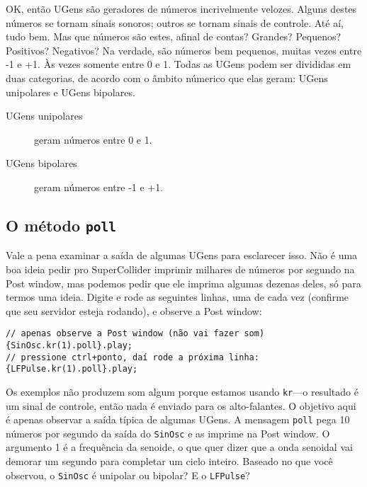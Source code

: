 OK, então UGens são geradores de números incrivelmente velozes. Alguns destes números se tornam sinais sonoros; outros se tornam sinais de controle. Até aí, tudo bem. Mas que números são estes, afinal de contas? Grandes? Pequenos? Positivos? Negativos? Na verdade, são números bem pequenos, muitas vezes entre -1 e +1. Às vezes somente entre 0 e 1. Todas as UGens podem ser divididas em duas categorias, de acordo com o âmbito númerico que elas geram: UGens unipolares e UGens bipolares.

\begin{description}
\item[UGens unipolares] geram números entre 0 e 1.
\item[UGens bipolares] geram números entre -1 e +1.

\end{description}

\subsection{O método \texttt{poll}}

Vale a pena examinar a saída de algumas UGens para esclarecer isso. Não é uma boa ideia pedir pro SuperCollider imprimir milhares de números por segundo na Post window, mas podemos pedir que ele imprima algumas dezenas deles, só para termos uma ideia. Digite e rode as seguintes linhas, uma de cada vez (confirme que seu servidor esteja rodando), e observe a Post window: 

\begin{lstlisting}[style=SuperCollider-IDE, basicstyle=\scttfamily\footnotesize]
// apenas observe a Post window (não vai fazer som)
{SinOsc.kr(1).poll}.play;
// pressione ctrl+ponto, daí rode a próxima linha:
{LFPulse.kr(1).poll}.play;
\end{lstlisting}

Os exemplos não produzem som algum porque estamos usando \texttt{kr}---o resultado é um sinal de controle, então nada é enviado para os alto-falantes. O objetivo aqui é apenas observar a saída típica de algumas UGens. A mensagem \texttt{poll} pega 10 números por segundo da saída do \texttt{SinOsc} e as imprime na Post window. O argumento 1 é a frequência da senoide, o que quer dizer que a onda senoidal vai demorar um segundo para completar um ciclo inteiro. Baseado no que você observou, o \texttt{SinOsc} é unipolar ou bipolar? E o \texttt{LFPulse}?

